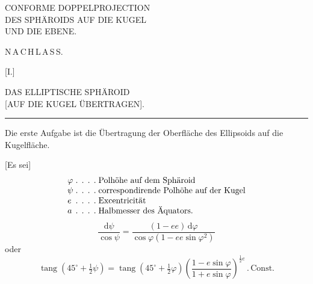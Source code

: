 \par\clearpage

\thispagestyle{empty}
\vspace*{\fill}
\begin{center}
\LARGE
CONFORME DOPPELPROJECTION\\[.5ex]
DES SPHÄROIDS AUF DIE KUGEL\\[.5ex]
UND DIE EBENE.
\end{center}
\vspace*{\fill}

\par\clearpage

\thispagestyle{empty}
\null

\par\clearpage

\vspace*{.11\textheight}
\begin{center}{\LARGE N\,A\,C\,H\,L\,A\,S\,S.}\end{center}
\vspace{.05\textheight}
\begin{center}
[I.]\par\bigskip
{\Large DAS ELLIPTISCHE SPHÄROID\\
{[AUF DIE KUGEL ÜBERTRAGEN].}}\par\bigskip
\rule{.09\textwidth}{.4pt}\par\bigskip
[1.]
\end{center}

Die erste Aufgabe ist die Übertragung der Oberfläche des Ellipsoids auf
die Kugelfläche.

[Es sei]
\[
\begin{array}{l@{\;\ldotp\;\ldotp\;\ldotp\;\ldotp\;}l}
\varphi & \text{Polhöhe auf dem Sphäroid}\\
\psi & \text{correspondirende Polhöhe auf der Kugel}\\
e & \text{Excentricität}\\
a & \text{Halbmesser des Äquators.}
\end{array}
\]
\[
\frac{\mathrm d\psi}{\cos\psi}
=\frac{(1-ee)\,\mathrm d\varphi}{\cos\varphi(1-ee\sin\varphi^2)}
\]
\noindent oder
\[
\operatorname{tang}(45^\circ+\tfrac12\psi)
=\operatorname{tang}(45^\circ+\tfrac12\varphi)
\left(\frac{1-e\sin\varphi}{1+e\sin\varphi}\right)^{\frac12 e}\,.\,\text{Const.}
\]

